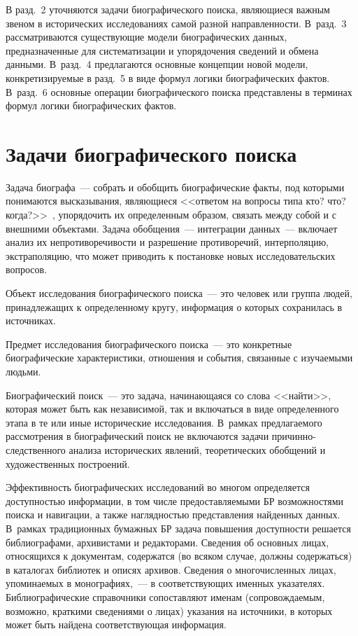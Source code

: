 \begin{multicols}{2}
  В разд.~2 уточняются задачи биографического поиска, 
являющиеся важным звеном в исторических исследованиях самой разной 
направленности. В~разд.~3 рассматриваются существующие модели 
биографических данных, предназначенные для систематизации и упорядочения 
сведений и обмена данными. В~разд.~4 предлагаются основные концепции 
новой модели, конкретизируемые в разд.~5 в виде формул логики 
биографических фактов. В~разд.~6 основные операции 
биографического поиска пред\-став\-ле\-ны в терминах формул логики 
биографических фактов.

\section{Задачи биографического поиска}
  
  Задача биографа~--- собрать и обобщить биографические факты, под 
которыми понимаются высказывания, являющиеся <<ответом на вопросы типа 
кто? что? когда?>>~\cite[с.~53]{4mar}, упорядочить их определенным образом, 
связать между собой и с внешними объектами. Задача обобщения~--- 
интеграции данных~--- включает анализ их непротиво\-ре\-чи\-вости и разрешение 
противоречий, интерполяцию, экстраполяцию, что может приводить к 
постановке новых исследовательских вопросов.
  
  Объект исследования биографического поиска~--- это человек или группа 
людей, принадлежащих к определенному кругу, информация о которых 
сохранилась в источниках. 

Предмет исследования биографического поиска~--- 
это конкретные биографические характеристики, отношения и события, 
связанные с изуча\-емы\-ми людьми. 

Биографический поиск~--- это задача, 
начинающаяся со слова <<найти>>, которая может быть как независимой, так и 
включаться в виде определенного этапа в те или иные исторические 
исследования. В~рамках предлагаемого рассмотрения в биографический поиск 
не включаются задачи при\-чин\-но-след\-ст\-вен\-но\-го анализа исторических явлений, 
теоретических обобщений и художественных построений.
  
  Эффективность биографических исследований во многом определяется 
доступностью информации, в том числе предоставляемыми БР возможностями 
поиска и навигации, а также наглядностью представления найденных данных. 
В~рамках традиционных бумажных БР задача повышения доступности решается 
библиографами, архивистами и редакторами. Сведения об основных лицах, 
относящихся к документам, содержатся (во всяком случае, должны 
содержаться) в каталогах библиотек и описях архивов. Сведения о 
многочисленных\linebreak
 лицах, упоминаемых в монографиях,~--- в соответствующих 
именных указателях. Библиографические справочники сопоставляют именам 
(со\-про\-вож\-да\-емым, возможно, краткими сведениями о\linebreak
 лицах) указания на 
источники, в которых может быть найде\-на соответствующая информация. 
  

\end{multicols}
